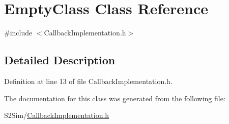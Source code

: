 \hypertarget{class_empty_class}{\section{Empty\-Class Class Reference}
\label{class_empty_class}
}


{\ttfamily \#include $<$Callback\-Implementation.\-h$>$}



\subsection{Detailed Description}


Definition at line 13 of file Callback\-Implementation.\-h.



The documentation for this class was generated from the following file\-:\begin{DoxyCompactItemize}
\item 
S2\-Sim/\hyperlink{_callback_implementation_8h}{Callback\-Implementation.\-h}\end{DoxyCompactItemize}

